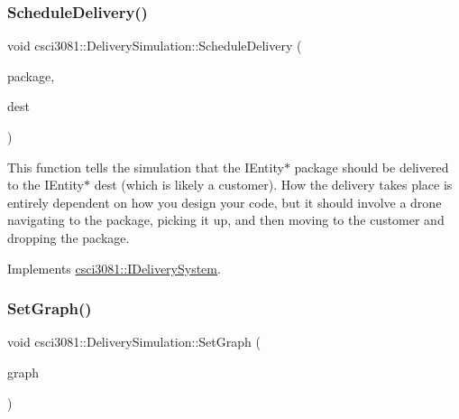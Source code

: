 \mbox{\label{classcsci3081_1_1DeliverySimulation_a4d777e31fb067b5a5475c88116a321e1}} 
\subsubsection{\texorpdfstring{Schedule\+Delivery()}{ScheduleDelivery()}}
{\footnotesize\ttfamily void csci3081\+::\+Delivery\+Simulation\+::\+Schedule\+Delivery (\begin{DoxyParamCaption}\item[{\hyperlink{classentity__project_1_1IEntity}{I\+Entity} $\ast$}]{package,  }\item[{\hyperlink{classentity__project_1_1IEntity}{I\+Entity} $\ast$}]{dest }\end{DoxyParamCaption})\hspace{0.3cm}{\ttfamily [virtual]}}

This function tells the simulation that the I\+Entity$\ast$ package should be delivered to the I\+Entity$\ast$ dest (which is likely a customer). How the delivery takes place is entirely dependent on how you design your code, but it should involve a drone navigating to the package, picking it up, and then moving to the customer and dropping the package. 

Implements \hyperlink{classcsci3081_1_1IDeliverySystem_a25210b242623675309c16e8a2c3cfd0e}{csci3081\+::\+I\+Delivery\+System}.

\mbox{\label{classcsci3081_1_1DeliverySimulation_a11ca7b8572484e707b3cd8285e522e9c}} 
\subsubsection{\texorpdfstring{Set\+Graph()}{SetGraph()}}
{\footnotesize\ttfamily void csci3081\+::\+Delivery\+Simulation\+::\+Set\+Graph (\begin{DoxyParamCaption}\item[{const \hyperlink{classentity__project_1_1IGraph}{I\+Graph} $\ast$}]{graph }\end{DoxyParamCaption})\hspace{0.3cm}{\ttfamily [virtual]}}

